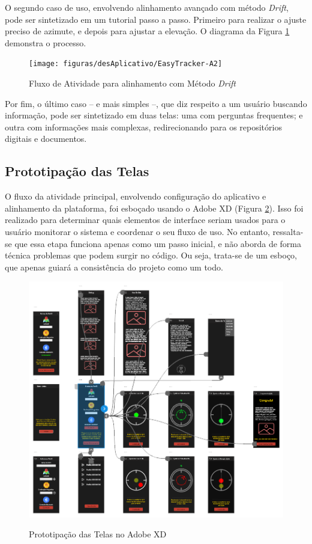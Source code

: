 O segundo caso de uso, envolvendo alinhamento avançado com método \textit{Drift}, pode ser sintetizado em um tutorial passo a passo. Primeiro para realizar o ajuste preciso de azimute, e depois para ajustar a elevação. O diagrama da Figura \ref{fig:atividadedrif} demonstra o processo.

\begin{figure}[!htb]
	\centering
	\caption{Fluxo de Atividade para alinhamento com Método \textit{Drift}}
	\texttt{[image: figuras/desAplicativo/EasyTracker-A2]}
	\label{fig:atividadedrif}
\end{figure}

Por fim, o último caso -- e mais simples --, que diz respeito a um usuário buscando informação, pode ser sintetizado em duas telas: uma com perguntas frequentes; e outra com informações mais complexas, redirecionando para os repositórios digitais e documentos. 

\subsection{Prototipação das Telas}

O fluxo da atividade principal, envolvendo configuração do aplicativo e alinhamento da plataforma, foi esboçado usando o Adobe XD (Figura \ref{fig:adobexd}). Isso foi realizado para determinar quais elementos de interface seriam usados para o usuário monitorar o sistema e coordenar o seu fluxo de uso. No entanto, ressalta-se que essa etapa funciona apenas como um passo inicial, e não aborda de forma técnica problemas que podem surgir no código. Ou seja, trata-se de um esboço, que apenas guiará a consistência do projeto como um todo.

\begin{figure}[!htb]
	\centering
	\caption{Prototipação das Telas no Adobe XD}
	\includegraphics[width=0.7\linewidth]{figuras/desAplicativo/adobexd}
	\label{fig:adobexd}
\end{figure}

